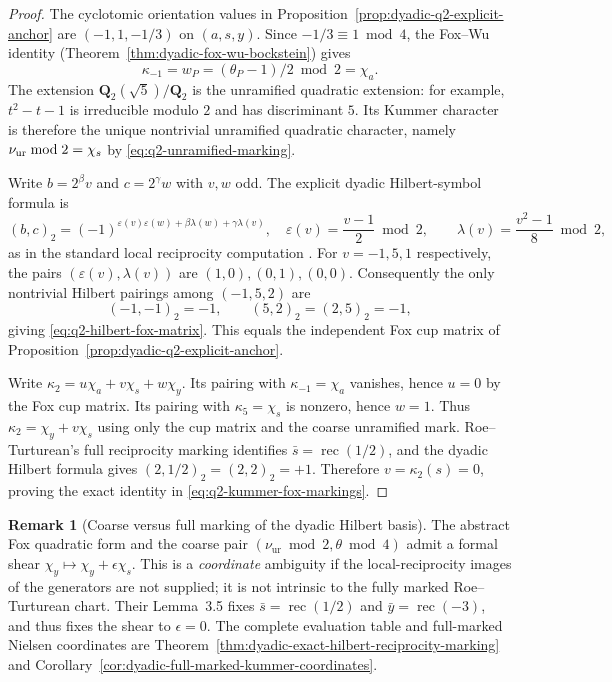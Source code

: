 \documentclass[11pt]{article}
\theoremstyle{definition}
\newtheorem{remark}[theorem]{Remark}
\begin{document}
\begin{proof}
The cyclotomic orientation values in
Proposition~\ref{prop:dyadic-q2-explicit-anchor}
are $(-1,1,-1/3)$ on $(a,s,y)$.
Since $-1/3\equiv1\bmod4$, the Fox--Wu identity
(Theorem~\ref{thm:dyadic-fox-wu-bockstein})
gives
\[
 \kappa_{-1}=w_P=(\theta_P-1)/2\bmod2=\chi_a.
\]
The extension $\mathbf Q_2(\sqrt5)/\mathbf Q_2$
is the unramified quadratic extension: for example,
$t^2-t-1$ is irreducible modulo $2$ and has
discriminant $5$.  Its Kummer character is
therefore the unique nontrivial unramified quadratic
character, namely $\nu_{\rm ur}\bmod2=\chi_s$
by \eqref{eq:q2-unramified-marking}.

Write $b=2^\beta v$ and $c=2^\gamma w$
with $v,w$ odd.  The explicit dyadic
Hilbert-symbol formula is
\begin{equation}\label{eq:q2-hilbert-explicit}
 (b,c)_2=(-1)^{
 \varepsilon(v)\varepsilon(w)
 +\beta\lambda(w)+\gamma\lambda(v)},
 \quad
 \varepsilon(v)=\frac{v-1}{2}\bmod2,\qquad
 \lambda(v)=\frac{v^2-1}{8}\bmod2,
\end{equation}
as in the standard local reciprocity computation
\cite{RoeTurtureanGQ2,NSW}.
For $v=-1,5,1$ respectively, the pairs
$(\varepsilon(v),\lambda(v))$ are
$(1,0),(0,1),(0,0)$.
Consequently the only nontrivial Hilbert
pairings among $(-1,5,2)$ are
\[
 (-1,-1)_2=-1,\qquad
 (5,2)_2=(2,5)_2=-1,
\]
giving \eqref{eq:q2-hilbert-fox-matrix}.
This equals the independent Fox cup matrix
of Proposition~\ref{prop:dyadic-q2-explicit-anchor}.

Write $\kappa_2=u\chi_a+v\chi_s+w\chi_y$.
Its pairing with $\kappa_{-1}=\chi_a$
vanishes, hence $u=0$ by the Fox cup matrix.
Its pairing with $\kappa_5=\chi_s$ is nonzero,
hence $w=1$.
Thus $\kappa_2=\chi_y+v\chi_s$ using only the cup
matrix and the coarse unramified mark.
Roe--Turturean's full reciprocity marking identifies
$\bar s=\operatorname{rec}(1/2)$, and the dyadic Hilbert
formula gives $(2,1/2)_2=(2,2)_2=+1$.
Therefore $v=\kappa_2(s)=0$, proving the exact
identity in \eqref{eq:q2-kummer-fox-markings}.
\end{proof}

\begin{remark}[Coarse versus full marking of the dyadic Hilbert basis]
\label{rem:q2-hilbert-shear-boundary}
The abstract Fox quadratic form and the coarse pair
$(\nu_{\mathrm{ur}}\bmod2,\theta\bmod4)$
admit a formal shear
$\chi_y\mapsto\chi_y+\epsilon\chi_s$.
This is a \emph{coordinate} ambiguity if the
local-reciprocity images of the generators are
not supplied; it is not intrinsic to the
fully marked Roe--Turturean chart.
Their Lemma~3.5 fixes
$\bar s=\operatorname{rec}(1/2)$ and
$\bar y=\operatorname{rec}(-3)$,
and thus fixes the shear to $\epsilon=0$.
The complete evaluation table and full-marked
Nielsen coordinates are
Theorem~\ref{thm:dyadic-exact-hilbert-reciprocity-marking}
and Corollary~\ref{cor:dyadic-full-marked-kummer-coordinates}.
\end{remark}
\end{document}
